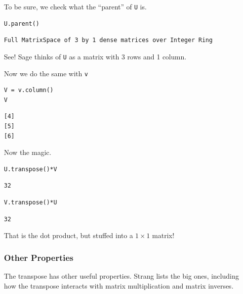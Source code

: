 \documentclass[10pt,]{book}
\theoremstyle{plain}
\numberwithin{equation}{section}
\begin{document}
        To be sure, we check what the ``parent'' of \verb?U? is.
\begin{lstlisting}[style=sageinput]
U.parent()
\end{lstlisting}
\begin{lstlisting}[style=sageoutput]
Full MatrixSpace of 3 by 1 dense matrices over Integer Ring
\end{lstlisting}
\par

        See! Sage thinks of \verb?U? as a matrix with 3 rows and 1 column.
\par

        Now we do the same with \verb?v?
\begin{lstlisting}[style=sageinput]
V = v.column()
V
\end{lstlisting}
\begin{lstlisting}[style=sageoutput]
[4]
[5]
[6]
\end{lstlisting}
\par

        Now the magic.
\begin{lstlisting}[style=sageinput]
U.transpose()*V
\end{lstlisting}
\begin{lstlisting}[style=sageoutput]
32
\end{lstlisting}
\begin{lstlisting}[style=sageinput]
V.transpose()*U
\end{lstlisting}
\begin{lstlisting}[style=sageoutput]
32
\end{lstlisting}
\par

        That is the dot product, but stuffed into a \(1\times 1\) matrix!
\typeout{************************************************}
\typeout{************************************************}
\subsubsection[Other Properties]{Other Properties}\label{subsubsection-33}

        The transpose has other useful properties. Strang lists the big ones,
        including how the transpose interacts with matrix multiplication and
        matrix inverses.
\typeout{************************************************}
\typeout{************************************************}
\end{document}
